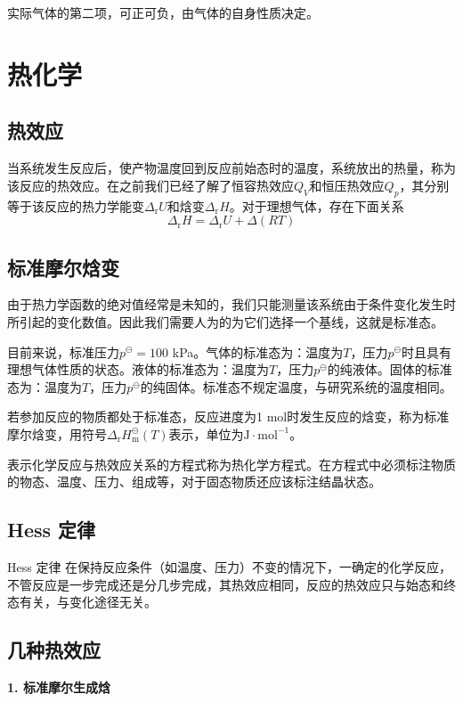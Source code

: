 \documentclass[lang=cn,newtx,10pt,scheme=chinese]{elegantbook}
\begin{document}
实际气体的第二项，可正可负，由气体的自身性质决定。

\section{热化学}
\subsection{热效应}
当系统发生反应后，使产物温度回到反应前始态时的温度，系统放出的热量，称为该反应的热效应。在之前我们已经了解了恒容热效应$Q_V$和恒压热效应$Q_p$，其分别等于该反应的热力学能变$\Delta_\mathrm{r}U$和焓变$\Delta_\mathrm{r}H$。对于理想气体，存在下面关系
\begin{equation}
	\Delta_\mathrm{r}H=\Delta_\mathrm{r}U+\Delta(RT)
\end{equation}

\subsection{标准摩尔焓变}
由于热力学函数的绝对值经常是未知的，我们只能测量该系统由于条件变化发生时所引起的变化数值。因此我们需要人为的为它们选择一个基线，这就是标准态。

目前来说，标准压力$p^\ominus = 100$ kPa。气体的标准态为：温度为$T$，压力$p^\ominus$时且具有理想气体性质的状态。液体的标准态为：温度为$T$，压力$p^\ominus$的纯液体。固体的标准态为：温度为$T$，压力$p^\ominus$的纯固体。标准态不规定温度，与研究系统的温度相同。

若参加反应的物质都处于标准态，反应进度为1 mol时发生反应的焓变，称为标准摩尔焓变，用符号$\Delta_{\mathrm{r}}H^{\ominus}_{\mathrm{m}}(T)$表示，单位为$\mathrm{J \cdot mol^{-1}}$。

表示化学反应与热效应关系的方程式称为热化学方程式。在方程式中必须标注物质的物态、温度、压力、组成等，对于固态物质还应该标注结晶状态。

\subsection{Hess 定律}
\begin{theorem}{Hess 定律}
	在保持反应条件（如温度、压力）不变的情况下，一确定的化学反应，不管反应是一步完成还是分几步完成，其热效应相同，反应的热效应只与始态和终态有关，与变化途径无关。
\end{theorem}

\subsection{几种热效应}
\textbf{1. 标准摩尔生成焓}
\end{document}
